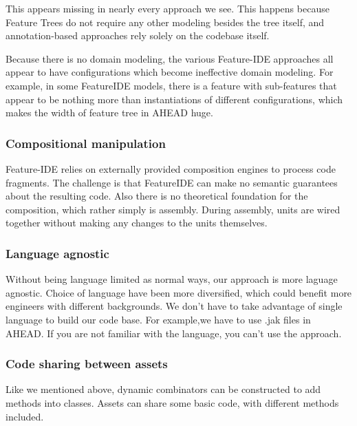 This appears missing in nearly every approach we see. This happens because Feature Trees do not require any
other modeling besides the tree itself, and annotation-based approaches rely solely on the codebase itself.

Because there is no domain modeling, the various Feature-IDE approaches all appear to have configurations
which become ineffective domain modeling. For example, in some FeatureIDE models,
there is a feature with sub-features that appear to be nothing more than instantiations of different
configurations, which makes the width of feature tree in AHEAD huge.

\subsubsection{Compositional manipulation}

Feature-IDE relies on externally provided composition engines to process code fragments. The challenge
is that FeatureIDE can make no semantic guarantees about the resulting code. Also there is no theoretical
foundation for the composition, which rather simply is assembly. During assembly, units are wired together
without making any changes to the units themselves.

\subsubsection{Language agnostic}


Without being language limited as normal ways, our approach is more laguage agnostic. Choice of language have
been more diversified, which could benefit more engineers with different backgrounds. We don't have to take
advantage of single language to build our code base. For example,we have to use .jak files in AHEAD. If
you are not familiar with the language, you can't use the approach.

\subsubsection{Code sharing between assets}


Like we mentioned above, dynamic combinators can be constructed to add methods into classes. Assets can share
some basic code, with different methods included.